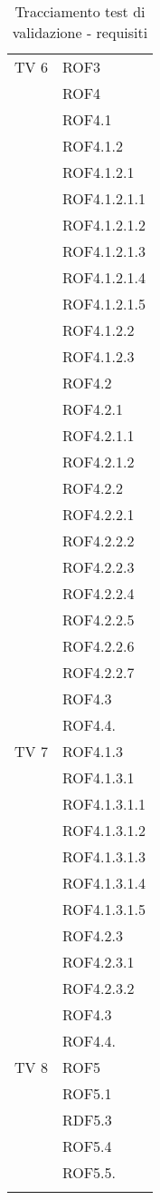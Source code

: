 \begin{center}
\begin{longtable}{|p{7cm}|p{7cm}|}
\midrule
TV 6 & ROF3\\ &  ROF4\\ &  ROF4.1\\ &  ROF4.1.2\\ &  ROF4.1.2.1\\ &  ROF4.1.2.1.1\\ &  ROF4.1.2.1.2\\ &  ROF4.1.2.1.3\\ &  ROF4.1.2.1.4\\ &  ROF4.1.2.1.5\\ &  ROF4.1.2.2\\ &  ROF4.1.2.3\\ &  ROF4.2\\ &  ROF4.2.1\\ &  ROF4.2.1.1\\ &  ROF4.2.1.2\\ &  ROF4.2.2\\ &  ROF4.2.2.1\\ &  ROF4.2.2.2\\ &  ROF4.2.2.3\\ &  ROF4.2.2.4\\ &  ROF4.2.2.5\\ &  ROF4.2.2.6\\ &  ROF4.2.2.7\\ &  ROF4.3\\ &  ROF4.4.\\
\midrule
TV 7 & ROF4.1.3\\ &  ROF4.1.3.1\\ &  ROF4.1.3.1.1\\ &  ROF4.1.3.1.2\\ &  ROF4.1.3.1.3\\ &  ROF4.1.3.1.4\\ &  ROF4.1.3.1.5\\ &  ROF4.2.3\\ &  ROF4.2.3.1\\ &  ROF4.2.3.2\\ &  ROF4.3\\ &  ROF4.4.\\
\midrule
TV 8 & ROF5\\ &  ROF5.1\\ &  RDF5.3\\ &  ROF5.4\\ &  ROF5.5.\\

\bottomrule
\caption{Tracciamento test di validazione - requisiti}
\label{tab:changelog}
\end{longtable}
\end{center}

